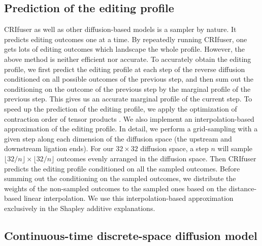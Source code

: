 \documentclass{article}
\begin{document}
\subsection{Prediction of the editing profile}

CRIfuser as well as other diffusion-based models is a sampler by nature. It predicts editing outcomes one at a time. By repeatedly running CRIfuser, one gets lots of editing outcomes which landscape the whole profile. However, the above method is neither efficient nor accurate. To accurately obtain the editing profile, we first predict the editing profile at each step of the reverse diffusion conditioned on all possible outcomes of the previous step, and then sum out the conditioning on the outcome of the previous step by the marginal profile of the previous step. This gives us an accurate marginal profile of the current step. To speed up the prediction of the editing profile, we apply the optimization of contraction order of tensor products \cite{smith2018opt_einsum}. We also implement an interpolation-based approximation of the editing profile. In detail, we perform a grid-sampling with a given step along each dimension of the diffusion space (the upstream and downstream ligation ends). For our $32\times 32$ diffusion space, a step $n$ will sample $\lfloor32/n\rfloor\times \lfloor32/n\rfloor$ outcomes evenly arranged in the diffusion space. Then CRIfuser predicts the editing profile conditioned on all the sampled outcomes. Before summing out the conditioning on the sampled outcomes, we distribute the weights of the non-sampled outcomes to the sampled ones based on the distance-based linear interpolation. We use this interpolation-based approximation exclusively in the Shapley additive explanations.

\subsection{Continuous-time discrete-space diffusion model}
\end{document}
